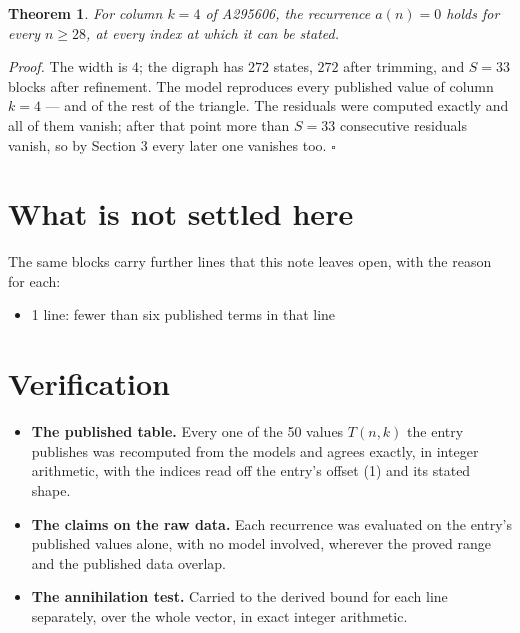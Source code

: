 \documentclass[11pt]{article}
\newtheorem{theorem}{Theorem}
\theoremstyle{definition}
\begin{document}
\begin{theorem} For column $k = 4$ of A295606, the recurrence $a(n) = 0$ holds for every $n \ge 28$, at every index at which it can be stated.\end{theorem}

{\itshape Proof.} The width is $4$; the digraph has $272$ states, $272$ after trimming, and $S = 33$ blocks after refinement. The model reproduces every published value of column $k = 4$ --- and of the rest of the triangle. The residuals were computed exactly and all of them vanish; after that point more than $S = 33$ consecutive residuals vanish, so by Section 3 every later one vanishes too. $\square$

\section{What is not settled here}

The same blocks carry further lines that this note leaves open, with the reason for each:

\begin{itemize}

\item 1 line: fewer than six published terms in that line

\end{itemize}

\section{Verification}

\begin{itemize}

\item {\bfseries The published table.} Every one of the 50 values $T(n,k)$ the entry publishes was recomputed from the models and agrees exactly, in integer arithmetic, with the indices read off the entry's offset (1) and its stated shape.

\item {\bfseries The claims on the raw data.} Each recurrence was evaluated on the entry's published values alone, with no model involved, wherever the proved range and the published data overlap.

\item {\bfseries The annihilation test.} Carried to the derived bound for each line separately, over the whole vector, in exact integer arithmetic.

\end{itemize}
\end{document}
